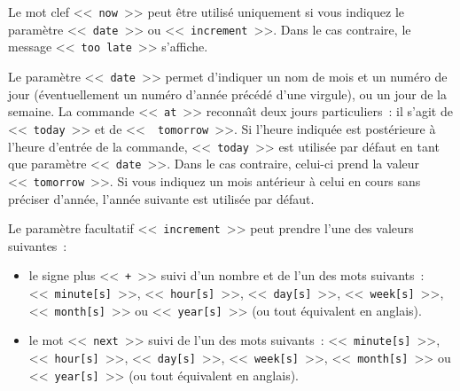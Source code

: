 \begin{remarque}
	Le mot clef <<~{\tt now}~>> peut {\^e}tre utilis{\'e} uniquement si vous indiquez le param{\`e}tre
	<<~{\tt date}~>> ou <<~{\tt increment}~>>. Dans le cas contraire, le message
	<<~{\tt too late}~>> s'affiche.
\end{remarque}

Le param{\`e}tre <<~{\tt date}~>> permet d'indiquer un nom de mois et un
num{\'e}ro de jour ({\'e}ventuellement un num{\'e}ro d'ann{\'e}e pr{\'e}c{\'e}d{\'e} d'une virgule),
ou un jour de la semaine. La commande <<~{\tt at}~>> reconna{\^\i}t deux
jours particuliers~: il s'agit de <<~{\tt today}~>> et de <<~{\tt
tomorrow}~>>. Si l'heure indiqu{\'e}e est post{\'e}rieure {\`a} l'heure d'entr{\'e}e de
la commande, <<~{\tt today}~>> est utilis{\'e}e par d{\'e}faut en tant que
param{\`e}tre <<~{\tt date}~>>. Dans le cas contraire, celui-ci prend la
valeur <<~{\tt tomorrow}~>>. Si vous indiquez un mois ant{\'e}rieur {\`a} celui
en cours sans pr{\'e}ciser d'ann{\'e}e, l'ann{\'e}e suivante est utilis{\'e}e par
d{\'e}faut.

Le param{\`e}tre facultatif <<~{\tt increment}~>> peut prendre l'une des
valeurs suivantes~:
\begin{itemize}
	\item	le signe plus <<~{\tt +}~>> suivi d'un nombre et de l'un des mots suivants~:
			<<~{\tt minute[s]}~>>, <<~{\tt hour[s]}~>>, <<~{\tt day[s]}~>>, <<~{\tt week[s]}~>>,
			<<~{\tt month[s]}~>> ou <<~{\tt year[s]}~>> (ou tout {\'e}quivalent en anglais).
	\item	le mot <<~{\tt next}~>> suivi de l'un des mots suivants~: <<~{\tt minute[s]}~>>,
			<<~{\tt hour[s]}~>>, <<~{\tt day[s]}~>>, <<~{\tt week[s]}~>>,
			<<~{\tt month[s]}~>> ou <<~{\tt year[s]}~>> (ou tout {\'e}quivalent en anglais).
\end{itemize}

